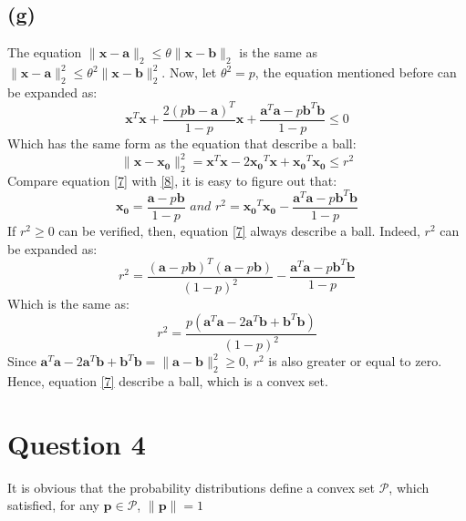 \documentclass[10pt,a4paper]{article}
\begin{document}
\subsection*{(g)}
The equation $\| \mathbf{x} - \mathbf{a} \|_{2} \leq \theta \| \mathbf{x} - \mathbf{b} \|_{2}$ is the same as $\| \mathbf{x} - \mathbf{a} \|^{2}_{2} \leq \theta^{2} \| \mathbf{x} - \mathbf{b} \|^{2}_{2}$. Now, let $\theta^{2} = p$, the equation mentioned before can be expanded as:
\begin{equation}
	\mathbf{x}^{T}\mathbf{x} + \frac{2 (p \mathbf{b} - \mathbf{a})^{T}}{1 - p} \mathbf{x} + \frac{\mathbf{a}^{T} \mathbf{a} - p \mathbf{b}^{T}\mathbf{b}}{1 - p} \leq 0
	\label{7}
\end{equation}
Which has the same form as the equation that describe a ball:
\begin{equation}
	\| \mathbf{x} - \mathbf{x_{0}} \|^{2}_{2} = \mathbf{x}^{T} \mathbf{x} - 2 \mathbf{x_{0}}^{T} \mathbf{x} + \mathbf{x_{0}}^{T} \mathbf{x_{0}} \leq r^{2}
	\label{8}
\end{equation}
Compare equation \ref{7} with \ref{8}, it is easy to figure out that:
\begin{equation*}
	\mathbf{x_{0}} = \frac{\mathbf{a} - p \mathbf{b}}{1 - p} \textit{ and } r^{2} = \mathbf{x_{0}}^{T} \mathbf{x_{0}} - \frac{\mathbf{a}^{T} \mathbf{a} - p \mathbf{b}^{T} \mathbf{b}}{1 - p}
\end{equation*}
If $r^{2} \geq 0 $ can be verified, then, equation \ref{7} always describe a ball. Indeed, $r^{2}$ can be expanded as:
\begin{equation*}
	r^{2} = \frac{(\mathbf{a} - p \mathbf{b})^{T} (\mathbf{a} - p \mathbf{b})}{(1 - p)^{2}} - \frac{\mathbf{a}^{T} \mathbf{a} - p \mathbf{b}^{T} \mathbf{b}}{1 - p}
\end{equation*}
Which is the same as:
\begin{equation*}
	r^{2} = \frac{p(\mathbf{a}^{T} \mathbf{a} - 2 \mathbf{a}^{T} \mathbf{b} + \mathbf{b}^{T} \mathbf{b})}{(1 - p)^{2}}
\end{equation*}
Since $\mathbf{a}^{T} \mathbf{a} - 2 \mathbf{a}^{T}\mathbf{b} + \mathbf{b}^{T} \mathbf{b} = \| \mathbf{a} - \mathbf{b} \|^{2}_{2} \geq 0$, $r^{2}$ is also greater or equal to zero. Hence, equation \ref{7} describe a ball, which is a convex set.

\section*{Question 4}
It is obvious that the probability distributions define a convex set $\mathcal{P}$, which satisfied, for any $\mathbf{p} \in \mathcal{P}$, $\| \mathbf{p} \| = 1$
\end{document}
